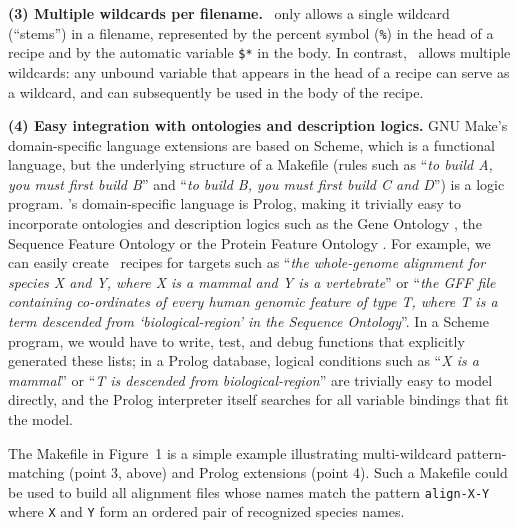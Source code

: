 {\bf (3) Multiple wildcards per filename.}
\make\ only allows a single wildcard (``stems'') in a filename,
represented by the percent symbol ({\tt \%}) in the head of a recipe and by the automatic variable {\tt \$*} in the body.
In contrast, \biomake\ allows multiple wildcards: any unbound variable that appears in the head of a recipe can serve as a wildcard,
and can subsequently be used in the body of the recipe.



{\bf (4) Easy integration with ontologies and description logics.}
GNU Make's domain-specific language extensions are based on Scheme, which is a functional language,
but the underlying structure of a Makefile (rules such as ``{\em to build A, you must first build B}'' and ``{\em to build B, you must first build C and D}'')
is a logic program.
\biomake's domain-specific language is Prolog, making it trivially easy to incorporate ontologies and description logics
such as the Gene Ontology \citep{GeneOntology2000,GeneOntology2015}, the Sequence Feature Ontology \citep{SequenceOntology2005} or the Protein Feature Ontology \citep{ProteinFeatureOntology2008}.
For example, we can easily create \biomake\ recipes for targets such as ``{\em the whole-genome alignment for species X and Y, where X is a mammal and Y is a vertebrate}''
or ``{\em the GFF file containing co-ordinates of every human genomic feature of type T, where T is a term descended from `biological-region' in the Sequence Ontology}''.
In a Scheme program, we would have to write, test, and debug functions that explicitly generated these lists;
in a Prolog database, logical conditions such as ``{\em X is a mammal}'' or ``{\em T is descended from biological-region}'' are trivially easy to model directly,
and the Prolog interpreter itself searches for all variable bindings that fit the model.

The Makefile in Figure~1 is a simple example illustrating multi-wildcard pattern-matching (point 3, above) and Prolog extensions (point 4).
Such a Makefile could be used to build all alignment files whose names match the pattern {\tt align-X-Y} where {\tt X} and {\tt Y} form an ordered pair of recognized species names.

